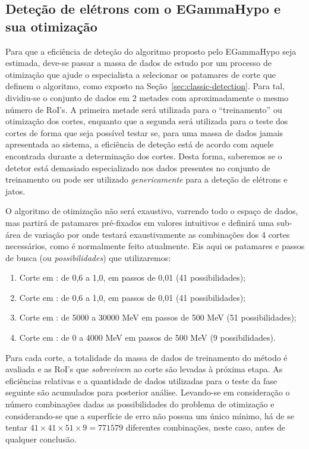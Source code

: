 \subsection{Deteção de elétrons com o EGammaHypo e sua otimização}
\label{sec:eghypo}

Para que a eficiência de deteção do algoritmo proposto pelo EGammaHypo seja
estimada, deve-se passar a massa de dados de estudo por um processo de
otimização que ajude o especialista a selecionar os patamares de corte que
definem o algoritmo, como exposto na Seção~\ref{sec:classic-detection}. Para
tal, dividiu-se o conjunto de dados em 2 metades com aproximadamente o mesmo
número de RoI's. A primeira metade será utilizada para o ``treinamento'' ou
otimização dos cortes, enquanto que a segunda será utilizada para o teste dos
cortes de forma que seja possível testar se, para uma massa de dados jamais
apresentada ao sistema, a eficiência de deteção está de acordo com aquele
encontrada durante a determinação dos cortes. Desta forma, saberemos se o
detetor está demasiado especializado nos dados presentes no conjunto de
treinamento ou pode ser utilizado \emph{genericamente} para a deteção de
elétrons e jatos.

O algoritmo de otimização não será exaustivo, varrendo todo o espaço de dados,
mas partirá de patamares pré-fixados em valores intuitivos e definirá uma
sub-área de variação por onde testará exaustivamente as combinações dos 4
cortes necessários, como é normalmente feito atualmente. Eis aqui os patamares
e passos de busca (ou \emph{possibilidades}) que utilizaremos:

\begin{enumerate}
\item Corte em \rcore: de 0,6 a 1,0, em passos de 0,01 (41 possibilidades);
\item Corte em \eratio: de 0,6 a 1,0, em passos de 0,01 (41 possibilidades);
\item Corte em \etem: de 5000 a 30000 MeV em passos de 500 MeV (51
possibilidades);
\item Corte em \ethad: de 0 a 4000 MeV em passos de 500 MeV (9
possibilidades). 
\end{enumerate}

Para cada corte, a totalidade da massa de dados de treinamento do método é
avaliada e as RoI's que \textit{sobrevivem} ao corte são levadas à próxima
etapa. As eficiências relativas e a quantidade de dados utilizadas para o teste
da fase seguinte são acumulados para posterior análise. Levando-se em
consideração o número combinações dadas as possibilidades do problema de
otimização e considerando-se que a superfície de erro não possua um único
mínimo, há de se tentar $41 \times 41 \times 51 \times 9 = 771579$ diferentes
combinações, neste caso, antes de qualquer conclusão.

